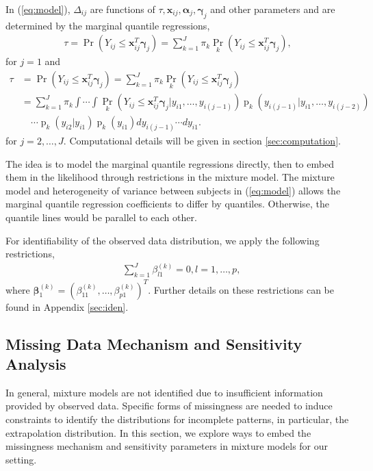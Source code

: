 \documentclass[12pt]{article}
\DeclareMathOperator{\pr}{p}
\DeclareMathOperator{\prob}{Pr}
\begin{document}
In (\ref{eq:model}), $\Delta_{ij}$ are functions of $\tau, \bm x_{ij},
\bm \alpha_j, \bm \gamma_j$ and other parameters and are determined by
the marginal quantile regressions,
\begin{align}
  \label{eq:deltaeqn1}
  \tau = \prob (Y_{ij} \leq \bm x_{ij}^T \bm \gamma_j ) = \sum_{k=1}^J
  \pi_k\prob_k (Y_{ij} \leq \bm x_{ij}^T \bm \gamma_j ),
\end{align}
for $j = 1$ and
\begin{align}\label{eq:deltaeqn2}
  \tau &= \prob (Y_{ij} \leq \bm x_{ij}^{T} \bm \gamma_j ) =
  \sum_{k=1}^J
  \pi_k\prob_k (Y_{ij} \leq \bm x_{ij}^{T} \bm \gamma_j ) \\
  & = \sum_{k=1}^J \pi_k \int\cdots \int \prob_k (Y_{ij} \leq \bm
  x_{ij}^{T} \bm \gamma_j |y_{i1},\ldots,
  y_{i(j-1)}) \pr_k (y_{i(j-1)}| y_{i1}, \ldots, y_{i(j-2)})  \nonumber \\
  & \quad \cdots \pr_k (y_{i2}| y_{i1}) \pr_k(y_{i1})
  dy_{i(j-1)}\cdots dy_{i1}. \nonumber
\end{align}
for $j = 2, \ldots, J$. Computational details will be given in section
\ref{sec:computation}.

The idea is to model the marginal quantile regressions directly, then
to embed them in the likelihood through restrictions in the mixture
model. The mixture model and heterogeneity of variance between
subjects in (\ref{eq:model}) allows the marginal quantile regression
coefficients to differ by quantiles. Otherwise, the quantile lines
would be parallel to each other.

For identifiability of the observed data distribution, we apply the
following restrictions,
\begin{align*}
  & \sum_{k=1}^J \beta_{l1}^{(k)} = 0, l = 1,\ldots, p,
\end{align*}
where $\bm \beta_1^{(k)} = (\beta_{11}^{(k)}, \ldots,
\beta_{p1}^{(k)})^{T}$. Further details on these restrictions can be
found in Appendix \ref{sec:iden}.

\subsection{Missing Data Mechanism and Sensitivity Analysis}
\label{sec:sa}

In general, mixture models are not identified due to insufficient
information provided by observed data. Specific forms of missingness
are needed to induce constraints to identify the distributions for
incomplete patterns, in particular, the extrapolation distribution. In
this section, we explore ways to embed the missingness mechanism and
sensitivity parameters in mixture models for our setting.
\end{document}
